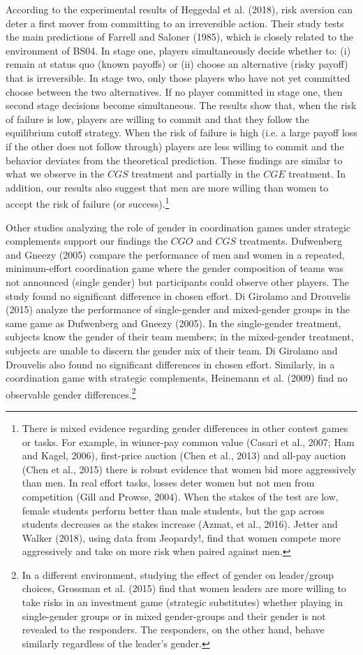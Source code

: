 \documentclass[11pt, letterpaper]{article}
\theoremstyle{plain}
\begin{document}
According to the experimental results of Heggedal et al. (2018), risk aversion can deter a first mover from committing to an irreversible action. Their study tests the main predictions of Farrell and Saloner (1985), which is closely related to the environment of BS04. In stage one, players simultaneously decide whether to: (i) remain at status quo (known payoffs) or (ii) choose an alternative (risky payoff) that is irreversible. In stage two, only those players who have not yet committed choose between the two alternatives. If no player committed in stage one, then second stage decisions become simultaneous. The results show that, when the risk of failure is low, players are willing to commit and that they follow the equilibrium cutoff strategy. When the risk of failure is high (i.e. a large payoff loss if the other does not follow through) players are less willing to commit and the behavior deviates from the theoretical prediction. These findings are similar to what we observe in the $CGS$ treatment and partially in the $CGE$ treatment. In addition, our results also suggest that men are more willing than women to accept the risk of failure (or success).\footnote{There is  mixed evidence regarding gender differences in other contest games or tasks. For example, in winner-pay common value (Casari et al., 2007; Ham and Kagel, 2006), first-price auction (Chen et al., 2013) and all-pay auction (Chen et al., 2015) there is robust evidence that women bid more aggressively than men. In real effort tasks, losses deter women but not men from competition (Gill and Prowse, 2004). When the stakes of the test are low, female students perform better than male students, but the gap across students decreases as the stakes increase (Azmat, et al., 2016). Jetter and Walker (2018), using data from Jeopardy!, find that women compete more aggressively and take on more risk when paired against men.} 

Other studies analyzing the role of gender in coordination games under strategic complements support our findings the $CGO$ and $CGS$ treatments. Dufwenberg and Gneezy (2005) compare the performance of men and women in a repeated, minimum-effort coordination game where the gender composition of teams was not announced (single gender) but participants could observe other players. The study found no significant difference in chosen effort. Di Girolamo and Drouvelis (2015) analyze the performance of single-gender and mixed-gender groups in the same game as Dufwenberg and Gneezy (2005). In the single-gender treatment, subjects know the gender of their team members; in the mixed-gender treatment, subjects are unable to discern the gender mix of their team. Di Girolamo and Drouvelis also found no significant differences in chosen effort. Similarly, in a coordination game with strategic complements, Heinemann et al. (2009) find no observable gender differences.\footnote{In a different environment, studying the effect of gender on leader/group choices, Grossman et al. (2015) find that women leaders are more willing to take risks in an investment game (strategic substitutes) whether playing in single-gender groups or in mixed gender-groups and their gender is not revealed to the responders. The responders, on the other hand, behave similarly regardless of the leader's gender.}
\end{document}
